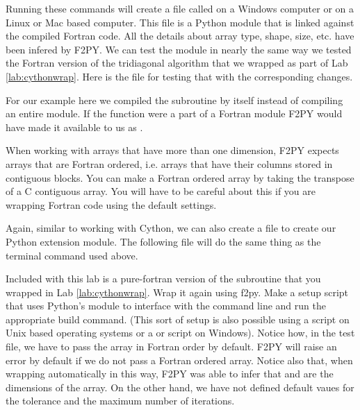 Running these commands will create a file called  on a Windows computer or  on a Linux or Mac based computer.
This file is a Python module that is linked against the compiled Fortran code.
All the details about array type, shape, size, etc. have been infered by F2PY.
We can test the module in nearly the same way we tested the Fortran version of the tridiagonal algorithm that we wrapped as part of Lab \ref{lab:cythonwrap}.
Here is the file for testing that with the corresponding changes.

\begin{info}
For our example here we compiled the subroutine by itself instead of compiling an entire module.
If the function were a part of a Fortran module  F2PY would have made it available to us as .
\end{info}

\begin{warn}
When working with arrays that have more than one dimension, F2PY expects arrays that are Fortran ordered, i.e. arrays that have their columns stored in contiguous blocks.
You can make a Fortran ordered array by taking the transpose of a C contiguous array.
You will have to be careful about this if you are wrapping Fortran code using the default settings.
\end{warn}

Again, similar to working with Cython, we can also create a  file to create our Python extension module.
The following  file will do the same thing as the terminal command used above.


\begin{problem}
Included with this lab is a pure-fortran version of the  subroutine that you wrapped in Lab \ref{lab:cythonwrap}.
Wrap it again using f2py.
Make a setup script that uses Python's  module to interface with the command line and run the appropriate build command.
(This sort of setup is also possible using a  script on Unix based operating systems or a  or  script on Windows).
Notice how, in the test file, we have to pass the array in Fortran order by default.
F2PY will raise an error by default if we do not pass a Fortran ordered array.
Notice also that, when wrapping automatically in this way, F2PY was able to infer that  and  are the dimensions of the array.
On the other hand, we have not defined default vaues for the tolerance and the maximum number of iterations.
\end{problem}

